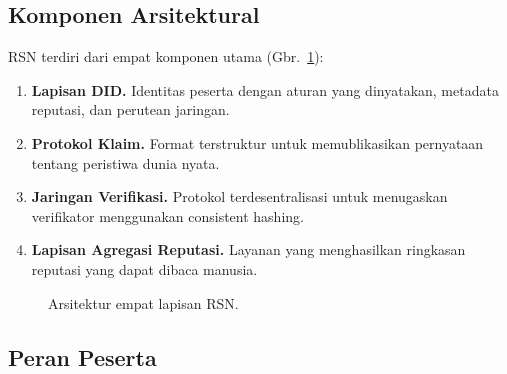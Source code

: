 \documentclass[11pt,a4paper,twocolumn]{article}
\begin{document}
\subsection{Komponen Arsitektural}

RSN terdiri dari empat komponen utama (Gbr.~\ref{fig:architecture}):
\begin{enumerate}[nosep]
\item \textbf{Lapisan DID.} Identitas peserta dengan aturan yang dinyatakan, metadata reputasi, dan perutean jaringan.
\item \textbf{Protokol Klaim.} Format terstruktur untuk memublikasikan pernyataan tentang peristiwa dunia nyata.
\item \textbf{Jaringan Verifikasi.} Protokol terdesentralisasi untuk menugaskan verifikator menggunakan consistent hashing.
\item \textbf{Lapisan Agregasi Reputasi.} Layanan yang menghasilkan ringkasan reputasi yang dapat dibaca manusia.
\end{enumerate}

\begin{figure}[ht]
\centering
{}
\caption{Arsitektur empat lapisan RSN.}
\label{fig:architecture}
\end{figure}

\subsection{Peran Peserta}
\end{document}
